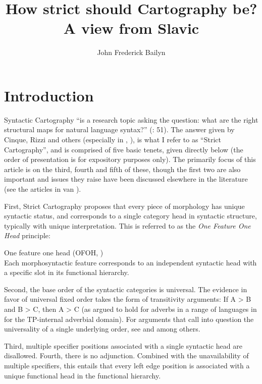 \documentclass[output=paper]{langscibook}
\author{John Frederick Bailyn\affiliation{Stony Brook University}\orcid{}}
\title{How strict should Cartography be? A view from Slavic}
\begin{document}
\maketitle

\section{Introduction}
Syntactic Cartography “is a research topic asking the question: what are the right structural maps for natural language syntax?” (\citealt{CinqueRizzi2010}: 51). The answer given by Cinque, Rizzi and others (especially in \citealt{cinque1999}, \citealt{CinqueRizzi2010, rizzicinque2016}), is what I refer to as “Strict Cartography”, and is comprised of five basic tenets, given directly below (the order of presentation is for expository purposes only). The primarily focus of this article is on the third, fourth and fifth of these, though the first two are also important and issues they raise have been discussed elsewhere in the literature (see the articles in van \citealt{Craenenbroeck2009}). 

First, Strict Cartography proposes that every piece of morphology has unique syntactic status, and corresponds to a single category head in syntactic structure, typically with unique interpretation. This is referred to as the \textit{One Feature One Head} principle: 


\begin{exe}
\ex \label{bai1}One feature one head (OFOH, \citealt[52]{CinqueRizzi2010}) \\
Each morphosyntactic feature corresponds to an independent  syntactic head with a specific slot in its functional hierarchy.
\end{exe}

Second, the base order of the syntactic categories is universal. The evidence in favor of universal fixed order takes the form of transitivity arguments: If A > B and B > C, then A > C (as argued to hold for adverbs in a range of languages in \citealt{cinque1999} for the TP-internal adverbial domain). For arguments that call into question the universality of a single underlying order, see \citet{Bobaljik1999} and \citet{Nilsen2003} among others. 

Third, multiple specifier positions associated with a single syntactic head are disallowed. Fourth, there is no adjunction. Combined with the unavailability of multiple specifiers, this entails that every left edge position is associated with a unique functional head in the functional hierarchy. 
\end{document}
